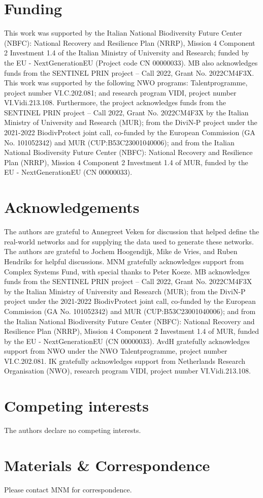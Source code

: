 \documentclass[a4paper,12pt]{article}
\begin{document}
\section{Funding}
This work was supported by the Italian National Biodiversity Future Center (NBFC): National Recovery and Resilience Plan (NRRP), Mission 4 Component 2 Investment 1.4 of the Italian Ministry of University and Research; funded by the EU - NextGenerationEU (Project code CN 00000033). MB also acknowledges funds from the SENTINEL PRIN project – Call 2022, Grant No. 2022CM4F3X.
This work was supported by the following NWO programs: Talentprogramme, project number VI.C.202.081; and research program VIDI, project number VI.Vidi.213.108. 
Furthermore, the project acknowledges funds from the SENTINEL PRIN project – Call 2022, Grant No. 2022CM4F3X by the Italian Ministry of University and Research (MUR);  from the DiviN-P project under the 2021-2022 BiodivProtect joint call, co-funded by the European Commission (GA No. 101052342) and MUR (CUP:B53C23001040006); and from the Italian National Biodiversity Future Center (NBFC): National Recovery and Resilience Plan (NRRP), Mission 4 Component 2 Investment 1.4 of MUR, funded by the EU - NextGenerationEU (CN 00000033).

\section{Acknowledgements}
The authors are grateful to Annegreet Veken for discussion that helped define the real-world networks and for supplying the data used to generate these networks. 
The authors are grateful to Jochem Hoogendijk, Mike de Vries, and Ruben Hendriks for helpful discussions. 
MNM gratefully acknowledges support from Complex Systems Fund, with special thanks to Peter Koeze. 
MB acknowledges funds from the SENTINEL PRIN project – Call 2022, Grant No. 2022CM4F3X by the Italian Ministry of University and Research (MUR);  from the DiviN-P project under the 2021-2022 BiodivProtect joint call, co-funded by the European Commission (GA No. 101052342) and MUR (CUP:B53C23001040006); and from the Italian National Biodiversity Future Center (NBFC): National Recovery and Resilience Plan (NRRP), Mission 4 Component 2 Investment 1.4 of MUR, funded by the EU - NextGenerationEU (CN 00000033).
AvdH gratefully acknowledges support from NWO under the NWO Talentprogramme, project number VI.C.202.081.
IK gratefully acknowledges support from Netherlands Research Organisation (NWO), research program VIDI, project number VI.Vidi.213.108. 

\section{Competing interests}
The authors declare no competing interests.

\section{Materials \& Correspondence}
Please contact MNM for correspondence.
\end{document}
